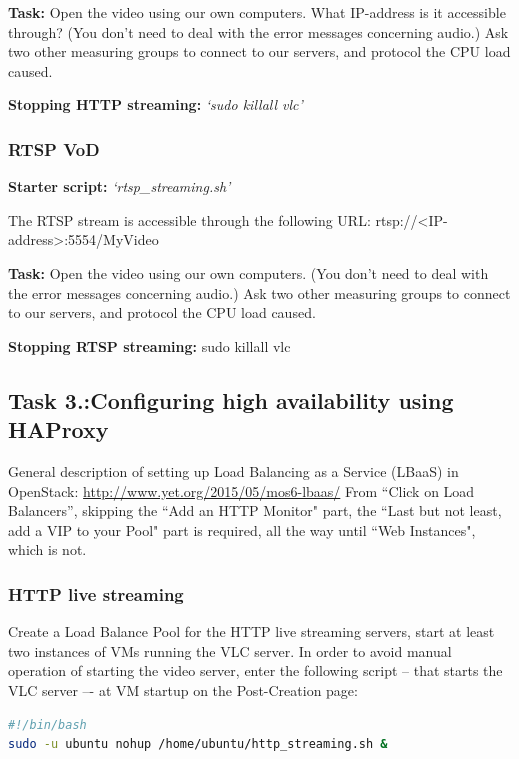 \documentclass[a4paper]{article}
\begin{document}
\noindent{}\textbf{Task:} Open the video using our own computers. What IP-address is it accessible through? (You don't need to deal with the error messages concerning audio.)
Ask two other measuring groups to connect to our servers, and protocol the CPU load caused.

\noindent{}\textbf{Stopping HTTP streaming:} \emph{`sudo killall vlc'}

\subsubsection{RTSP VoD}
\textbf{Starter script:}  \emph{`rtsp\_streaming.sh'}

\noindent{}The RTSP stream is accessible through the following URL: rtsp://{}\textless{}IP-address{}\textgreater{}:5554/MyVideo

\noindent{}\textbf{Task:} Open the video using our own computers. (You don't need to deal with the error messages concerning audio.)
Ask two other measuring groups to connect to our servers, and protocol the CPU load caused.

\noindent{}\textbf{Stopping RTSP streaming:} sudo killall vlc

\subsection{Task 3.:Configuring high availability using HAProxy}

General description of setting up Load Balancing as a Service (LBaaS) in OpenStack:
\url{http://www.yet.org/2015/05/mos6-lbaas/}
From “Click on Load Balancers”, skipping the ``Add an HTTP Monitor" part, the ``Last but not least, add a VIP to your Pool" part is required, all the way until ``Web Instances", which is not.

\subsubsection{HTTP live streaming}

Create a Load Balance Pool for the HTTP live streaming servers, start at least two instances of VMs running the VLC server. In order to avoid manual operation of starting the video server, enter the following script -- that starts the VLC server –- at VM startup on the Post-Creation page:
\begin{lstlisting}[language=bash,breaklines]
#!/bin/bash
sudo -u ubuntu nohup /home/ubuntu/http_streaming.sh &
\end{lstlisting}
\end{document}
